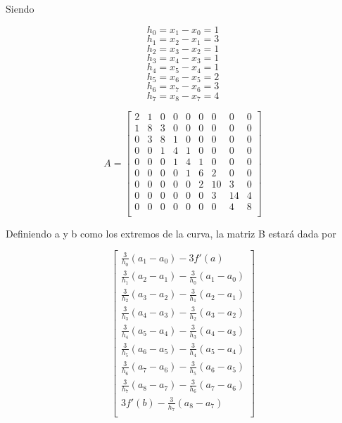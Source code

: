 Siendo

\begin{equation}
    h_0 = x_1 - x_0 = 1
\end{equation}
\begin{equation}
    h_1 = x_2 - x_1 = 3
\end{equation}
\begin{equation}
    h_2 = x_3 - x_2 = 1
\end{equation}
\begin{equation}
    h_3 = x_4 - x_3 = 1
\end{equation}
\begin{equation}
    h_4 = x_5 - x_4 = 1
\end{equation}
\begin{equation}
    h_5 = x_6 - x_5 = 2
\end{equation}
\begin{equation}
    h_6 = x_7 - x_6 = 3
\end{equation}
\begin{equation}
    h_7 = x_8 - x_7 = 4
\end{equation}

\begin{equation}
    A=\begin{bmatrix}
    2 & 1 & 0 & 0 & 0 & 0 & 0 & 0 & 0 \\
    1 & 8 & 3 & 0 & 0 & 0 & 0 & 0 & 0 \\
    0 & 3 & 8 & 1 & 0 & 0 & 0 & 0 & 0 \\
    0 & 0 & 1 & 4 & 1 & 0 & 0 & 0 & 0 \\
    0 & 0 & 0 & 1 & 4 & 1 & 0 & 0 & 0 \\
    0 & 0 & 0 & 0 & 1 & 6 & 2 & 0 & 0 \\
    0 & 0 & 0 & 0 & 0 & 2 & 10 & 3 & 0 \\
    0 & 0 & 0 & 0 & 0 & 0 & 3 & 14 & 4 \\
    0 & 0 & 0 & 0 & 0 & 0 & 0 & 4 & 8 \\
    \end{bmatrix}
\end{equation}

Definiendo a y b como los extremos de la curva, la matriz B estará dada por

\begin{equation}
    \begin{bmatrix}
    \frac{3}{h_0}(a_1-a_0)-3f'(a) \\
    \frac{3}{h_1}(a_2-a_1)-\frac{3}{h_0}(a_1-a_0)\\
    \frac{3}{h_2}(a_3-a_2)-\frac{3}{h_1}(a_2-a_1) \\
    \frac{3}{h_3}(a_4-a_3)-\frac{3}{h_2}(a_3-a_2) \\
    \frac{3}{h_4}(a_5-a_4)-\frac{3}{h_3}(a_4-a_3) \\
    \frac{3}{h_5}(a_6-a_5)-\frac{3}{h_4}(a_5-a_4) \\
    \frac{3}{h_6}(a_7-a_6)-\frac{3}{h_5}(a_6-a_5) \\
    \frac{3}{h_7}(a_8-a_7)-\frac{3}{h_6}(a_7-a_6) \\
    3f'(b)-\frac{3}{h_7}(a_8-a_7) \\
    \end{bmatrix}    
\end{equation}

